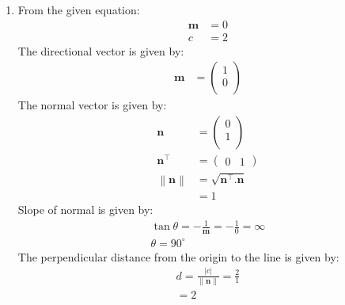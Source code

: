 \documentclass[12pt]{article}
\providecommand{\norm}[1]{\left\lVert#1\right\rVert}
\newcommand{\myvec}[1]{\ensuremath{\begin{pmatrix}#1\end{pmatrix}}}
\let\vec\mathbf
\begin{document}
\begin{enumerate}
\item From the given equation:
         \begin{align}                                                                                                 \vec{m}&=0\\                                                                        			c&=2
         \end{align}                                                                                          The directional vector is given by:
          \begin{align}
                  \vec{m}&=\myvec{1\\0\\}
          \end{align}
          The normal vector is given by:
                  \begin{align}
         \vec{n}&=\myvec{0\\1\\}\\
          \vec{n}^\top&=\myvec{0 & 1}\\
                       \norm{\vec{n}}&=\sqrt{\vec{n}^\top.\vec{n}}\\
                          &=1
                          \end{align}
          Slope of normal is given by:
		\begin{align}                                                                                                 \tan\theta=-\frac{1}{\vec{m}}=-\frac{1}{0}=\infty\\                             \theta=90^\circ
                \end{align}                                                                                 The perpendicular distance from the origin to the line is given by:                                          \begin{align}
			d=\frac{|c|}{\norm{\vec{n}}}=\frac{2}{1}\\                                                              =2
                  \end{align}
                  

\end{enumerate}
\end{document}
